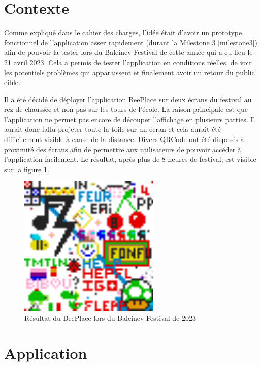 \section{Contexte}

Comme expliqué dans le cahier des charges, l'idée était d'avoir un prototype fonctionnel de l'application assez rapidement (durant la Milestone 3 \ref{milestone3}) afin de pouvoir la tester lors du Baleinev Festival de cette année qui a eu lieu le 21 avril 2023. Cela a permis de tester l'application en conditions réelles, de voir les potentiels problèmes qui apparaissent et finalement avoir un retour du public cible.

Il a été décidé de déployer l'application BeePlace sur deux écrans du festival au rez-de-chaussée et non pas sur les tours de l'école. La raison principale est que l'application ne permet pas encore de découper l'affichage en plusieurs parties. Il aurait donc fallu projeter toute la toile sur un écran et cela aurait été difficilement visible à cause de la distance. Divers QRCode ont été disposés à proximité des écrans afin de permettre aux utilisateurs de pouvoir accéder à l'application facilement. Le résultat, après plus de 8 heures de festival, est visible sur la figure \ref{fig:baleinev2023}.

\begin{figure}[H]
  \centering
  \includegraphics[width=0.6\textwidth]{./assets/figures/baleinev2023.png}
  \caption{Résultat du BeePlace lors du Baleinev Festival de 2023}
  \label{fig:baleinev2023}
\end{figure}

\section{Application}

